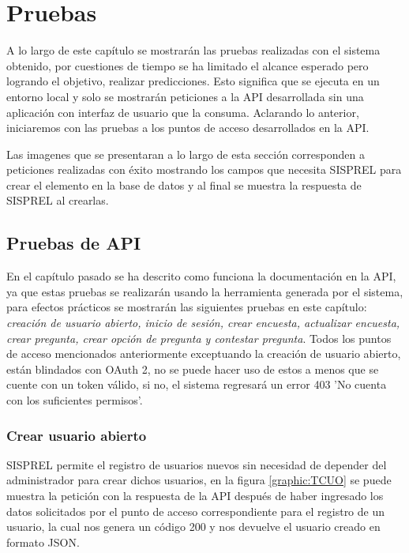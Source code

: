 \chapter{Pruebas} 
\vspace*{2cm}

A lo largo de este capítulo se mostrarán las pruebas realizadas con el sistema obtenido, por cuestiones de tiempo se ha limitado el alcance esperado pero logrando el objetivo, realizar predicciones. Esto significa que se ejecuta en un entorno local y solo se mostrarán peticiones a la API desarrollada sin una aplicación con interfaz de usuario que la consuma. Aclarando lo anterior, iniciaremos con las pruebas a los puntos de acceso desarrollados en la API.

Las imagenes que se presentaran a lo largo de esta sección corresponden a peticiones realizadas con éxito mostrando los campos que necesita SISPREL para crear el elemento en la base de datos y al final se muestra la respuesta de SISPREL al crearlas.

\section{Pruebas de API}
En el capítulo pasado se ha descrito como funciona la documentación en la API, ya que estas pruebas se realizarán usando la herramienta generada por el sistema, para efectos prácticos se mostrarán las siguientes pruebas en este capítulo: \textit{creación de usuario abierto, inicio de sesión, crear encuesta, actualizar encuesta, crear pregunta, crear opción de pregunta y contestar pregunta}. Todos los puntos de acceso mencionados anteriormente exceptuando la creación de usuario abierto, están blindados con OAuth 2, no se puede hacer uso de estos a menos que se cuente con un token válido, si no, el sistema regresará un error 403 'No cuenta con los suficientes permisos'.


\subsection{Crear usuario abierto}
SISPREL permite el registro de usuarios nuevos sin necesidad de depender del administrador para crear dichos usuarios, en la figura \ref{graphic:TCUO} se puede muestra la petición con la respuesta de la API después de haber ingresado los datos solicitados por el punto de acceso correspondiente para el registro de un usuario, la cual nos genera un código 200 y nos devuelve el usuario creado en formato JSON.

